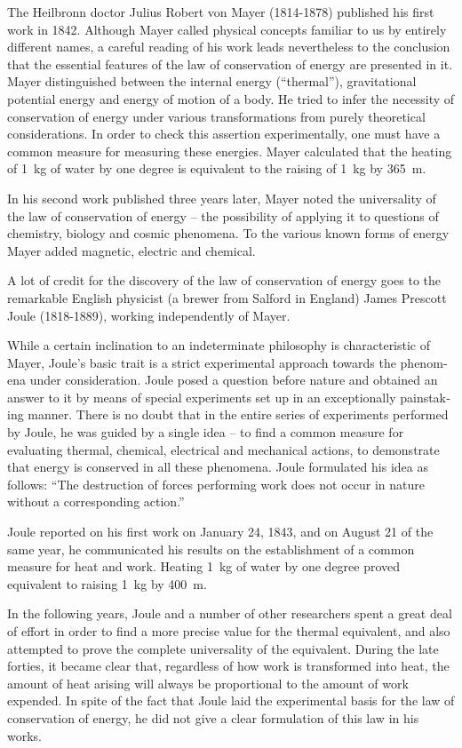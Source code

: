 The Heilbronn doctor Julius Robert von Mayer (1814-1878) published his first work in 1842. Although Mayer called physical concepts familiar to us by entirely dif­ferent names, a careful reading of his work leads never­theless to the conclusion that the essential features of the law of conservation of energy are presented in it. Mayer distinguished between the internal energy (``thermal''), gravitational potential energy and energy of motion of a body. He tried to infer the necessity of conservation of energy under various transformations from purely theoretical considerations. In order to check this assertion experimentally, one must have a common measure for measuring these energies. Mayer calculated that the heating of \SI{1}{\kilo\gram} of water by one degree is equiv­alent to the raising of \SI{1}{\kilo\gram} by \SI{365}{\meter}.

In his second work published three years later, Mayer noted the universality of the law of conservation of energy -- the possibility of applying it to questions of chemistry, biology and cosmic phenomena. To the various known forms of energy Mayer added magnetic, electric and chemical.

A lot of credit for the discovery of the law of con­servation of energy goes to the remarkable English physicist (a brewer from Salford in England) James Pres­cott Joule (1818-1889), working independently of Mayer.

While a certain inclination to an indeterminate phi­losophy is characteristic of Mayer, Joule’s basic trait is a strict experimental approach towards the phenom­ena under consideration. Joule posed a question before nature and obtained an answer to it by means of special experiments set up in an exceptionally painstak­ing manner. There is no doubt that in the entire series of experiments performed by Joule, he was guided by a single idea -- to find a common measure for evaluating thermal, chemical, electrical and mechanical actions, to demonstrate that energy is conserved in all these phenomena. Joule formulated his idea as follows: ``The destruction of forces performing work does not occur in nature without a corresponding action.''

Joule reported on his first work on January 24, 1843, and on August 21 of the same year, he communicated his results on the establishment of a common measure for heat and work. Heating \SI{1}{\kilo\gram} of water by one degree proved equivalent to raising  \SI{1}{\kilo\gram} by \SI{400}{\meter}.

In the following years, Joule and a number of other researchers spent a great deal of effort in order to find a more precise value for the thermal equivalent, and also attempted to prove the complete universality of the equivalent. During the late forties, it became clear that, regardless of how work is transformed into heat, the amount of heat arising will always be proportional to the amount of work expended. In spite of the fact that Joule laid the experimental basis for the law of conservation of energy, he did not give a clear formula­tion of this law in his works.


